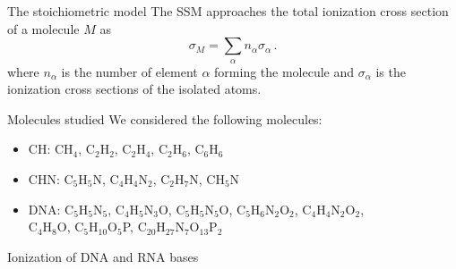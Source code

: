 \documentclass[final]{beamer}
\begin{document}
\begin{frame}[t]
\begin{columns}[t]
\begin{column}{.44\textwidth}
\begin{block}{The stoichiometric model}
The SSM approaches the total ionization cross 
section of a molecule $M$ as
\begin{equation}
 \sigma_{M}=\sum\limits_{\alpha}n_{\alpha}\sigma_{\alpha}\,.  
\end{equation}
where $n_{\alpha}$ is the number of element $\alpha$ forming the molecule
and $\sigma_{\alpha}$ is the ionization cross sections 
of the isolated atoms.
\end{block}

\begin{block}{Molecules studied}
\justify
We considered the following molecules:
\begin{itemize}
\item CH: \hspace{0.45cm} CH$_4$, C$_2$H$_2$, C$_2$H$_4$, C$_2$H$_6$, C$_6$H$_6$ \\
\item CHN: C$_5$H$_5$N, C$_4$H$_4$N$_2$, C$_2$H$_7$N, CH$_5$N \\
\item DNA: C$_5$H$_5$N$_5$, C$_4$H$_5$N$_3$O, C$_5$H$_5$N$_5$O, C$_5$H$_6$N$_2$O$_2$, C$_4$H$_4$N$_2$O$_2$, 
\\ \hspace{2.85cm} C$_4$H$_8$O, C$_5$H$_{10}$O$_5$P, C$_{20}$H$_{27}$N$_7$O$_{13}$P$_2$ 
\end{itemize}

\end{block}
\begin{block}{Ionization of DNA and RNA bases}
\justify


\end{block}
\end{column}
\end{columns}
\end{frame}
\end{document}
